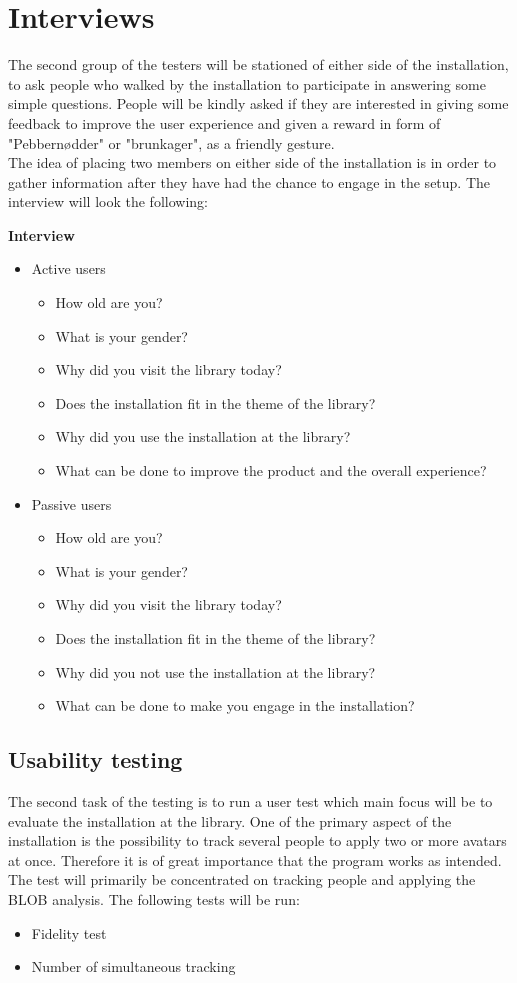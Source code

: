 \section{Interviews}
The second group of the testers will be stationed of either side of the installation, to ask people who walked by the installation to participate in answering some simple questions. People will be kindly asked if they are interested in giving some feedback to improve the user experience and given a reward in form of "Pebbern{\o}dder" or "brunkager", as a friendly gesture.\\
The idea of placing two members on either side of the installation is in order to gather information after they have had the chance to engage in the setup. The interview will look the following:

\textbf{Interview}
\begin{itemize}
\item Active users
\begin{itemize}
\item How old are you?
\item What is your gender?
\item Why did you visit the library today?
\item Does the installation fit in the theme of the library?
\item Why did you use the installation at the library?
\item What can be done to improve the product and the overall experience?
\end{itemize}
\item Passive users
\begin{itemize}
\item How old are you?
\item What is your gender? 
\item Why did you visit the library today?
\item Does the installation fit in the theme of the library?
\item Why did you not use the installation at the library?
\item What can be done to make you engage in the installation?
\end{itemize}
\end{itemize}

\subsection{Usability testing}
The second task of the testing is to run a user test which main focus will be to evaluate the installation at the library. One of the primary aspect of the installation is the possibility to track several people to apply two or more avatars at once. Therefore it is of great importance that the program works as intended.\\
The test will primarily be concentrated on tracking people and applying the BLOB analysis. The following tests will be run:  
\begin{itemize}
\item Fidelity test
\item Number of simultaneous tracking
\end{itemize}


